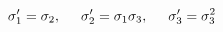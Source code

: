\begin{displaymath}
\sigma_1' = \sigma_2,\hspace{.5cm} \sigma_2' = \sigma_1 \sigma_3, \hspace{.5cm}\sigma_3' = \sigma_3^2  
\end{displaymath}
